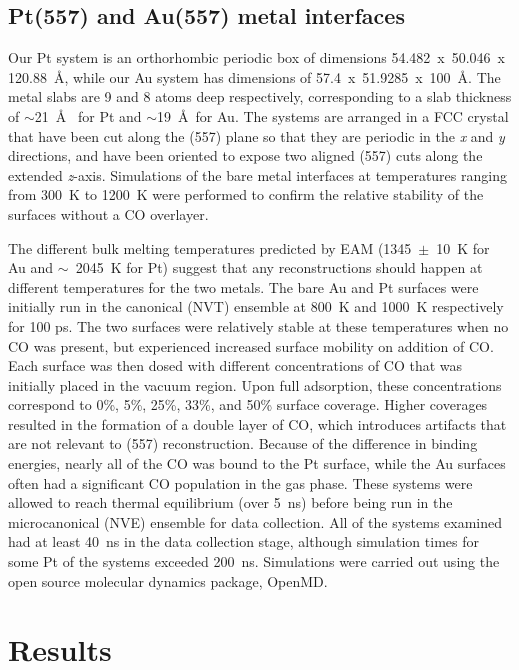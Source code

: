 \subsection{Pt(557) and Au(557) metal interfaces}
Our Pt system is an orthorhombic periodic box of dimensions
54.482~x~50.046~x 120.88~\AA, while our Au system has 
dimensions of 57.4~x~51.9285~x~100~\AA. The metal slabs 
are 9 and 8 atoms deep respectively, corresponding to a slab 
thickness of $\sim$21~\AA~ for Pt and $\sim$19~\AA~for Au.
The systems are arranged in a FCC crystal that have been cut
along the (557) plane so that they are periodic in the {\it x} and
{\it y} directions, and have been oriented to expose two aligned
(557) cuts along the extended {\it z}-axis.  Simulations of the 
bare metal interfaces at temperatures ranging from 300~K to
1200~K were performed to confirm the relative
stability of the surfaces without a CO overlayer.  

The different bulk melting temperatures predicted by EAM
(1345~$\pm$~10~K for Au\citep{Ahmed:2003lk} and $\sim$~2045~K for
Pt\citep{Bhattacharya:2011bq}) suggest that any reconstructions should happen at
different temperatures for the two metals.  The bare Au and Pt
surfaces were initially run in the canonical (NVT) ensemble at 800~K
and 1000~K respectively for 100 ps. The two surfaces were relatively
stable at these temperatures when no CO was present, but experienced
increased surface mobility on addition of CO. Each surface was then
dosed with different concentrations of CO that was initially placed in
the vacuum region.  Upon full adsorption, these concentrations
correspond to 0\%, 5\%, 25\%, 33\%, and 50\% surface coverage. Higher
coverages resulted in the formation of a double layer of CO, which
introduces artifacts that are not relevant to (557) reconstruction.
Because of the difference in binding energies, nearly all of the CO
was bound to the Pt surface, while the Au surfaces often had a
significant CO population in the gas phase.  These systems were
allowed to reach thermal equilibrium (over 5~ns) before being run in
the microcanonical (NVE) ensemble for data collection. All of the
systems examined had at least 40~ns in the data collection stage,
although simulation times for some Pt of the systems exceeded 200~ns.
Simulations were carried out using the open source molecular dynamics
package, OpenMD.\citep{Fennell:2006xq, Meineke:2005pt, openmd}


%
\section{Results}
